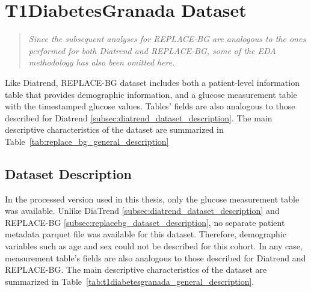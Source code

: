 \section{T1DiabetesGranada Dataset}
\label{sec:eda_t1diabetes_granada}

\begin{quote}
\small

\textit{Since the subsequent analyses for REPLACE-BG are analogous to the ones performed for both Diatrend and REPLACE-BG, some of the EDA methodology has also been omitted here.}

\end{quote}

\label{subsec:t1diabetes_dataset_description}

Like Diatrend, REPLACE-BG dataset includes both a patient-level information table that provides demographic information, and a glucose measurement table with the timestamped glucose values. Tables' fields are also analogous to those described for Diatrend \ref{subsec:diatrend_dataset_description}. The main descriptive characteristics of the dataset are summarized in Table~\ref{tab:replace_bg_general_description}

\subsection{Dataset Description}
\label{subsec:t1diabetesgranada_dataset_description}

In the processed version used in this thesis, only the glucose measurement table was available. Unlike DiaTrend \ref{subsec:diatrend_dataset_description} and REPLACE-BG \ref{subsec:replacebg_dataset_description}, no separate patient metadata parquet file was available for this dataset. Therefore, demographic variables such as age and sex could not be described for this cohort. In any case, measurement table's fields are also analogous to those described for Diatrend and REPLACE-BG. The main descriptive characteristics of the dataset are summarized in Table~\ref{tab:t1diabetesgranada_general_description}.

